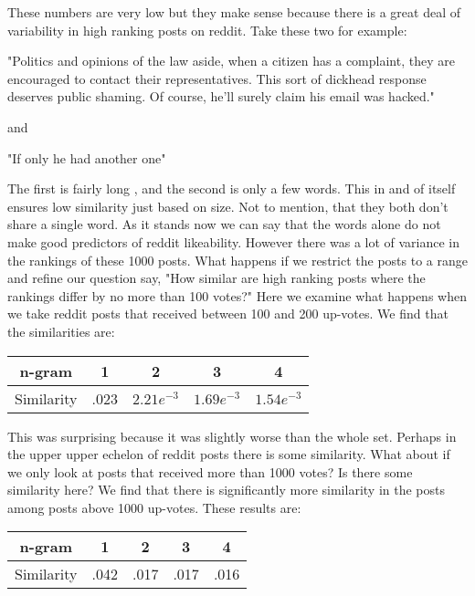 \documentclass[12pt]{article}
\numberwithin{equation}{section}
\begin{document}
	These numbers are very low but they make sense because there is a great deal of variability in high ranking posts on reddit.  Take these two for example:\newline
	
	"Politics and opinions of the law aside, when a citizen has a complaint, they are encouraged to contact their representatives.  This sort of dickhead response deserves public shaming. Of course, he'll surely claim his email was hacked."\newline
	
	and \newline
	
	"If only he had another one"
	
	The first is fairly long , and the second is only a few words.  This in and of itself ensures low similarity just based on size.  Not to mention, that they both don't share a single word.  As it stands now we can say that the words alone do not make good predictors of reddit likeability.  However there was a lot of variance in the rankings of these 1000 posts.  What happens if we restrict the posts to a range and refine our question say, "How similar are high ranking posts where the rankings differ by no more than 100 votes?"  Here we examine what happens when we take reddit posts that received between 100 and 200 up-votes.  We find that the similarities are:\newline
	
\begin{table}[h!]
	  \begin{tabular}{c | c c c c}
	  n-gram & 1 & 2 & 3 & 4\\
	  \hline
	  Similarity & .023 & $2.21e^{-3}$ & $1.69e^{-3}$ & $1.54e^{-3}$
	  \end{tabular}
	\end{table}
	This was surprising because it was slightly worse than the whole set.  Perhaps in the upper upper echelon of reddit posts there is some similarity.  What about if we only look at posts that received more than 1000 votes?  Is there some similarity here?  We find that there is significantly more similarity in the posts among posts above 1000 up-votes.  These results are:\newline
	
	\begin{table}[h!]
	  \begin{tabular}{c | c c c c}
	  n-gram & 1 & 2 & 3 & 4\\
	  \hline
	  Similarity & .042 & .017 & .017 & .016
	  \end{tabular}
	\end{table}
	
\end{document}
